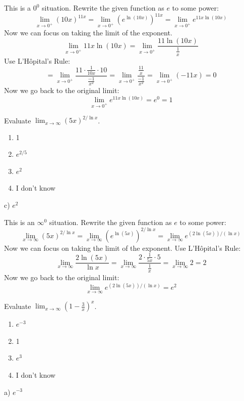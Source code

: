 \documentclass[addpoints,12pt,answers]{exam}
\begin{document}
\begin{questions}
\begin{solution}
    This is a $0^0$ situation. Rewrite the given function as $e$ to some power:
    $$\lim_{x\to 0^+}(10x)^{11x}=\lim_{x\to 0^+}(e^{\ln(10x)})^{11x}=\lim_{x\to 0^+}e^{11x\ln(10x)}$$
    Now we can focus on taking the limit of the exponent.
    $$\lim_{x\to 0^+}11x\ln(10x)=\lim_{x\to 0^+}\frac{11\ln(10x)}{\frac{1}{x}}$$
    Use L'H\^{o}pital's Rule:
    $$=\lim_{x\to 0^+}\frac{11\cdot\frac{1}{10x}\cdot 10}{\frac{-1}{x^2}}=\lim_{x\to 0^+}\frac{\frac{11}{x}}{\frac{-1}{x^2}}=\lim_{x\to 0^+}(-11x)=0$$
    Now we go back to the original limit:
    $$\lim_{x\to 0^+}e^{11x\ln(10x)}=e^0=1$$
  \end{solution}
  \newpage
  \question
  Evaluate $\displaystyle\lim_{x\to\infty}(5x)^{2/\ln x}$.
  \begin{enumerate}[label=\alph*)]
    \item
    1    
    \item
    $e^{2/5}$
    \item
    $e^2$
    \item
    I don't know
  \end{enumerate}
  \begin{solution}
    c) $e^2$
    
    This is an $\infty^0$ situation. Rewrite the given function as $e$ to some power:
    $$\lim_{x\to\infty}(5x)^{2/\ln x}=\lim_{x\to\infty}\left(e^{\ln(5x)}\right)^{2/\ln x}=\lim_{x\to\infty}e^{(2\ln(5x))/(\ln x)}$$
    Now we can focus on taking the limit of the exponent. Use L'H\^{o}pital's Rule:
    $$\lim_{x\to\infty}\frac{2\ln(5x)}{\ln x}=\lim_{x\to\infty}\frac{2\cdot\frac{1}{5x}\cdot 5}{\frac{1}{x}}=\lim_{x\to\infty}2=2$$
    Now we go back to the original limit:
    $$\lim_{x\to\infty}e^{(2\ln(5x))/(\ln x)}=e^2$$
  \end{solution}
  \newpage
  \question
  Evaluate $\displaystyle\lim_{x\to\infty}\left(1-\frac{3}{x}\right)^x$.
  \begin{enumerate}[label=\alph*)]
    \item
    $e^{-3}$
    \item
    1
    \item
    $e^3$
    \item
    I don't know
  \end{enumerate}
  \begin{solution}
    a) $e^{-3}$
    

\end{solution}
\end{questions}
\end{document}
